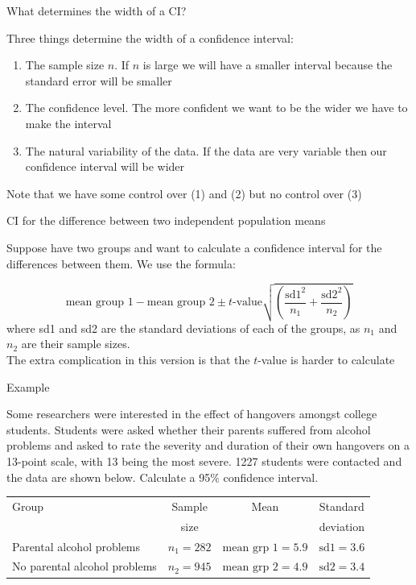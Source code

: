 \documentclass[12pt,xcolor=dvipsnames,handout,mathserif,aspectratio=169]{beamer}
\begin{document}
\begin{frame}{ What determines the width of a CI?}

Three things determine the width of a confidence interval:
\begin{enumerate}
\item The sample size $n$. If $n$ is large we will have a smaller interval because the standard error will be smaller
\item The confidence level. The more confident we want to be the wider we have to make the interval
\item The natural variability of the data. If the data are very variable then our confidence interval will be wider
\end{enumerate}
Note that we have some control over (1) and (2) but no control over (3)
\end{frame}

\begin{frame}{CI for the difference between two independent population means}

Suppose have two groups and want to calculate a confidence interval for the differences between them. We use the formula:

$$\mbox{mean group 1} - \mbox{mean group 2} \pm \mbox{$t$-value}\sqrt{ \left( \frac{\mbox{sd1}^2}{n_1}+\frac{\mbox{sd2}^2}{n_2} \right) }$$
where sd1 and sd2 are the standard deviations of each of the groups, as $n_1$ and $n_2$ are their sample sizes. \\
\vspace{0.5cm}
The extra complication in this version is that the $t$-value is harder to calculate
\end{frame}

\begin{frame}{Example}

\begin{block}{}
Some researchers were interested in the effect of hangovers amongst college students. Students were asked whether their parents suffered from alcohol problems and asked to rate the severity and duration of their own hangovers on a 13-point scale, with 13 being the most severe. 1227 students were contacted and the data are shown below. Calculate a 95\% confidence interval.
\begin{center}
\begin{tabular}{lccc}
\hline
Group & Sample & Mean & Standard \\
& size & & deviation \\
\hline
Parental alcohol problems & $n_1=282$ & $\mbox{mean grp 1}=5.9$ & $\mbox{sd1}=3.6$\\ 
No parental alcohol problems & $n_2=945$ & $\mbox{mean grp 2}=4.9$ & $\mbox{sd2}=3.4$\\
\hline
\end{tabular}
\end{center}
\end{block}
\end{frame}
\end{document}
